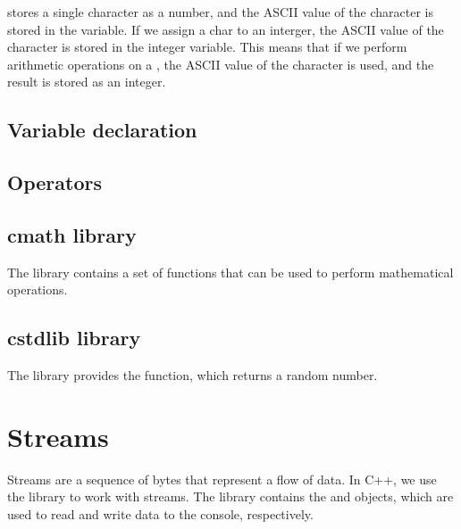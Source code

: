 \documentclass{article}
\begin{document}
 stores a single character as a number, and the ASCII value of the character is stored in the  variable. If we assign a char to an interger, the ASCII value of the character is stored in the integer variable. This means that if we perform arithmetic operations on a , the ASCII value of the character is used, and the result is stored as an integer.



\subsection{Variable declaration}


\subsection{Operators}


\subsection{cmath library}
The  library contains a set of functions that can be used to perform mathematical operations.


\subsection{cstdlib library}
The  library provides the  function, which returns a random number.


\section{Streams}
Streams are a sequence of bytes that represent a flow of data. In C++, we use the  library to work with streams. The  library contains the  and  objects, which are used to read and write data to the console, respectively.
\end{document}

